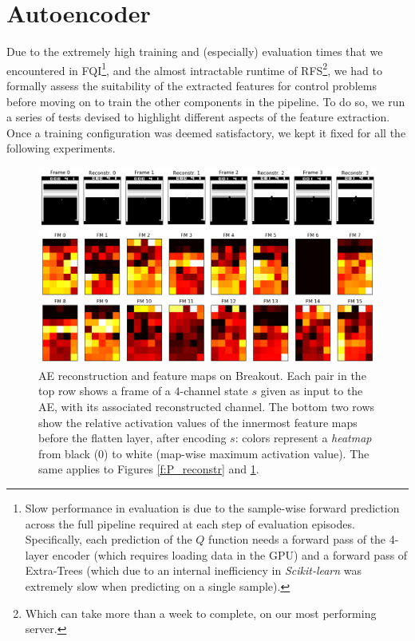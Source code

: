 \section{Autoencoder}
Due to the extremely high training and (especially) evaluation times that we 
encountered in FQI\footnote{Slow performance in evaluation is due to the 
sample-wise forward prediction across the full pipeline required at each step
of evaluation episodes. Specifically, each prediction of the $Q$ function needs 
a forward pass of the 4-layer encoder (which requires loading data in the GPU)
and a forward pass of Extra-Trees (which due to an internal inefficiency in 
\textit{Scikit-learn} was extremely slow when predicting on a single sample).},
and the almost intractable runtime of RFS\footnote{Which can take more than a 
week to complete, on our most performing server.}, we had to formally assess the 
suitability of the extracted features for control problems before moving on to 
train the other components in the pipeline. 
To do so, we run a series of tests devised to highlight different aspects of
the feature extraction. Once a training configuration was deemed satisfactory, 
we kept it fixed for all the following experiments.
%
\begin{figure}
    \includegraphics[width=\textwidth]{pictures/experiments/reconstr_breakout}
    \centering
    \caption[AE reconstruction and feature maps on Breakout]{AE reconstruction 
	    and feature maps on Breakout. 
	    Each pair in the top row shows a frame of a $4$-channel state $s$ 
	    given as input to the AE, with its associated reconstructed channel. 
	    The bottom two rows show the relative activation values of the 
	    innermost feature maps before the flatten layer, after encoding $s$: 
	    colors represent a \textit{heatmap} from black ($0$) to white 
	    (map-wise maximum activation value). The same applies to Figures 
	    \ref{f:P_reconstr} and \ref{f:BO_reconstr}.}
    \label{f:BO_reconstr}
\end{figure}
